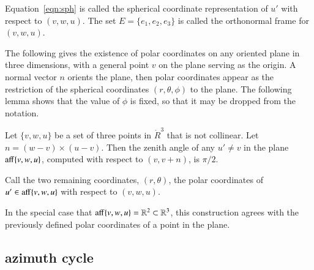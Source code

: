 \begin{definition}[frame]\label{def:sph}
Equation~\ref{eqn:sph} is called the spherical coordinate representation of
$u'$ with respect to $(v,w,u)$.  The set $E=\{e_1,e_2,e_3\}$ is called
the orthonormal frame for $(v,w,u)$.  
\end{definition}

The following gives the existence of polar coordinates on any oriented
plane in three dimensions, with a general point $v$ on the plane
serving as the origin.  A normal vector $n$  orients the plane,
then polar coordinates appear as the restriction of the
spherical coordinates $(r,\theta,\phi)$ to the plane.
The following lemma shows that the value of $\phi$ is fixed, so that
it may be dropped from the notation.

\begin{lemma}\label{lemma:polar-gen}
Let $\{v,w,u\}$ be a set of three points in $\ring{R}^3$
that is not collinear.
Let $n = (w-v) \times (u-v)$.
Then the zenith angle of any $u'\ne v$ in the plane ${\operatorname{aff}}\{v,w,u\}$,
computed with respect to $(v,v+n)$,
is $\pi/2$.
\end{lemma}

\begin{definition}\label{def:polar}
Call  the two remaining coordinates, $(r,\theta)$, 
the polar coordinates of $u'\in{\operatorname{aff}}\{v,w,u\}$ with
respect to $(v,w,u)$.
\end{definition}

In the special case that ${\operatorname{aff}}\{v,w,u\}=\mathbb{R}^2\subset \mathbb{R}^3$, this
construction agrees with the previously defined polar coordinates of a point in
the plane.

\subsection{azimuth cycle}

